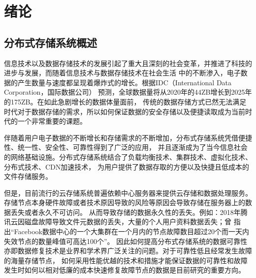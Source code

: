 \chapter{绪论}

\section{分布式存储系统概述}
信息技术以及数据存储技术的发展引起了重大且深刻的社会变革，并推进了科技的进步与发展，而随着信息技术与数据存储技术在社会生活
中的不断渗入，电子数据的产生数量与速度都呈现着爆炸式的增长。根据IDC（International Data Corporation，国际数据公司）
预测，全球数据量将从2020年的44ZB增长到2025年的175ZB\cite{rydning2018digitization}。在如此急剧增长的数据体量面前，
传统的数据存储方式已然无法满足时代对于数据存储的需求，所以如何保证数据的安全存储以及便捷读取成为当前时代的一个非常重要的课题。

伴随着用户电子数据的不断增长和存储需求的不断增加，分布式存储系统凭借便捷性、统一性、安全性、可靠性得到了广泛的应用，
并且逐渐成为了当今信息社会的网络基础设施。分布式存储系统结合了负载均衡技术、集群技术、虚拟化技术、分布式技术、CDN加速技术，
为用户提供了数据存取的方便以及快捷且低成本的文件存储服务。

但是，目前流行的云存储系统普遍依赖中心服务器来提供云存储和数据处理服务\cite{wang2018blockchain}。
存储节点本身硬件故障或者技术原因导致的风险等原因会导致存储在服务器上的数据丢失或者永久不可访问。
从而导致存储的数据永久性的丢失。例如：2018年腾讯云因磁盘故障导致文件元数据的丢失，大量的个人用户资料数据丢失；\citet{sathiamoorthy2013xoring}曾
指出“Facebook数据中心的一个大集群在一个月内的节点故障数目超过20个而一天内失效节点的数量峰值可高达100个”。
因此如何提高分布式存储系统的数据可靠性亦即数据修复技术是业界和学术界广泛关注的问题。对于可靠性低且经常发生故障的海量存储节点，
如何采用性能优越的技术和措施才能保证数据的可靠性和故障发生时如何以相对低廉的成本快速修复故障节点的数据是目前研究的重要方向。

